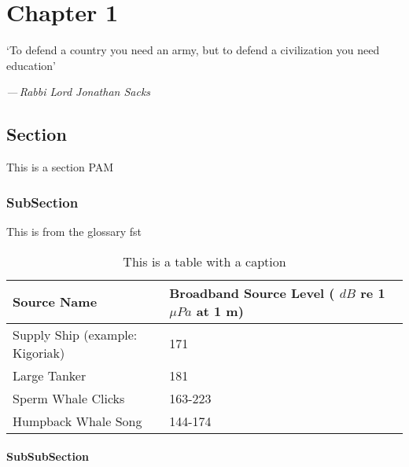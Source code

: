 \documentclass[class=report,11pt,crop=false]{standalone}
\begin{document}
\ifstandalone
    \tableofcontents
    \listoffigures
    \listoftables
    \printnoidxglossary[type=\acronymtype,,nonumberlist]
    \printnoidxglossary[type=Symbols,nonumberlist]
    \printnoidxglossary[type=Abbreviations,nonumberlist] %
\fi

\chapter{Chapter 1\label{ch:chapter1}}

\epigraph{`To defend a country you need an army, but to defend a civilization you need education'}%
{\emph{---\,Rabbi Lord Jonathan Sacks}}
\vspace{0.5cm}

\section{Section}

This is a section \gls{PAM}

\subsection{SubSection}

This is from the glossary \gls{fst}

\begin{table}[H]
    \label{table:DeepSeaNoise2006_acoustic_levels}
    \centering
    \begin{tabular}{l|l}
        Source Name                     & Broadband Source Level ( \( dB \) re 1 \(\mu Pa \) at 1 m) \\ \hline
        Supply Ship (example: Kigoriak) & 171                                                        \\
        Large Tanker                    & 181                                                        \\
        Sperm Whale Clicks              & 163-223                                                    \\
        Humpback Whale Song             & 144-174                                                    \\
    \end{tabular}
    \caption{This is a table with a caption}
\end{table}


\subsubsection{SubSubSection}
\end{document}
